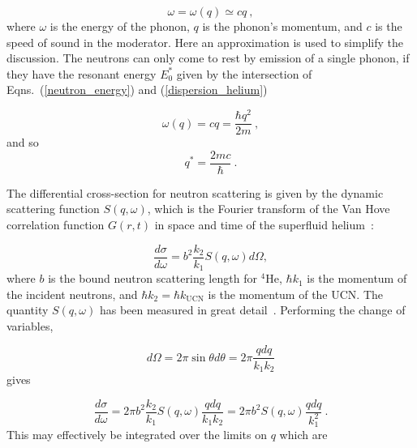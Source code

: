 \begin{equation}
\label{dispersion_helium}
\omega=\omega(q) \simeq cq~,
\end{equation}
where $\omega$ is the energy of the phonon, $q$ is the phonon's
momentum, and $c$ is the speed of sound in the moderator. Here an
approximation is used to simplify the discussion. The neutrons can
only come to rest by emission of a single phonon, if they have the
resonant energy $E_0^*$ given by the intersection of
Eqns.~(\ref{neutron_energy}) and (\ref{dispersion_helium})

\begin{equation}
\omega(q)=cq=\frac{\hbar q^2}{2m}~,
\end{equation}
and so
\begin{equation}
q^*=\frac{2mc}{\hbar}~.
\end{equation}


The differential cross-section for neutron scattering is given by the
dynamic scattering function $S(q,\omega)$, which is the Fourier
transform of the Van Hove correlation function $G(r,t)$ in space and
time of the superfluid helium~\cite{Squires}:

\begin{equation}
\frac{d\sigma}{d\omega}=b^2 \frac{k_2}{k_1}S(q,\omega) d\Omega,
\end{equation}
where $b$ is the bound neutron scattering length for $^4$He,
$\hbar k_1$ is the momentum of the incident neutrons, and
$\hbar k_2=\hbar k_{\text{UCN}}$ is the momentum of the UCN. The
quantity $S(q,\omega)$ has been measured in great
detail~\cite{S_func1,gibbs1999collective,S_func3}. Performing the
change of variables,

\begin{equation}
d\Omega=2 \pi \sin \theta d \theta = 2 \pi \frac{q dq}{k_1 k_2}
\end{equation}
gives

\begin{equation}
 \frac{d\sigma}{d\omega}=2\pi b^2 \frac{k_2}{k_1}S(q,\omega)\frac{q
   dq}{k_1 k_2}=2\pi b^2 S(q,\omega)\frac{q dq}{k_1^2}~.
\end{equation}
This may effectively be integrated over the limits on $q$ which are

